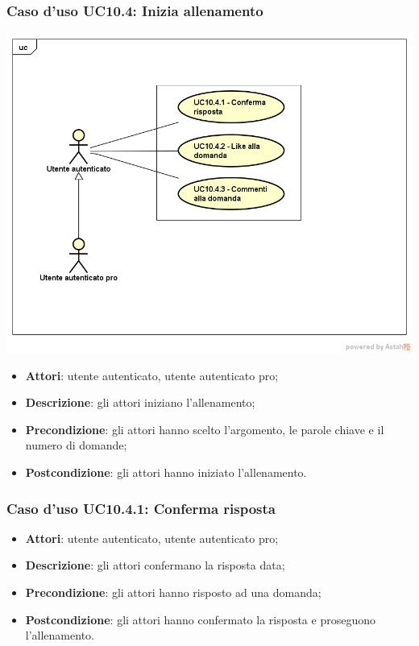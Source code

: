 \subsubsection{Caso d'uso UC10.4: Inizia allenamento}
\label{UC10.4}
\begin{center}
	\centering
	\includegraphics[scale=0.5]{UML/UC10_4.png}
\end{center}
\FloatBarrier
	\begin{itemize}
		\item \textbf{Attori}: utente autenticato, utente autenticato pro;
		\item \textbf{Descrizione}: gli attori iniziano l'allenamento;
		\item \textbf{Precondizione}: gli attori hanno scelto l'argomento, le parole chiave e il numero di domande;
		\item \textbf{Postcondizione}: gli attori hanno iniziato l'allenamento.
	\end{itemize}
\subsubsection{Caso d'uso UC10.4.1: Conferma risposta}
	\begin{itemize}
		\item \textbf{Attori}: utente autenticato, utente autenticato pro;
		\item \textbf{Descrizione}: gli attori confermano la risposta data;
		\item \textbf{Precondizione}: gli attori hanno risposto ad una domanda;
		\item \textbf{Postcondizione}: gli attori hanno confermato la risposta e proseguono l'allenamento.
	\end{itemize}
